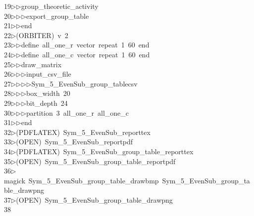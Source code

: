 \begin{tabbing}
19\>$\triangleright$\>$\triangleright$\>group\_theoretic\_activity\ \\[0pt]
20\>$\triangleright$\>$\triangleright$\>$\triangleright$\>export\_group\_table\ \\[0pt]
21\>$\triangleright$\>$\triangleright$\>end\\[0pt]
22\>$\triangleright$\>(ORBITER)\ v\ 2\ \\[0pt]
23\>$\triangleright$\>$\triangleright$\>define\ all\_one\_r\ vector\ repeat\ 1\ 60\ end\ \\[0pt]
24\>$\triangleright$\>$\triangleright$\>define\ all\_one\_c\ vector\ repeat\ 1\ 60\ end\ \\[0pt]
25\>$\triangleright$\>$\triangleright$\>draw\_matrix\ \\[0pt]
26\>$\triangleright$\>$\triangleright$\>$\triangleright$\>input\_csv\_file\ \\[0pt]
27\>$\triangleright$\>$\triangleright$\>$\triangleright$\>$\triangleright$\>Sym\_5\_EvenSub\_group\_tablecsv\ \\[0pt]
28\>$\triangleright$\>$\triangleright$\>$\triangleright$\>box\_width\ 20\ \\[0pt]
29\>$\triangleright$\>$\triangleright$\>$\triangleright$\>bit\_depth\ 24\ \\[0pt]
30\>$\triangleright$\>$\triangleright$\>$\triangleright$\>partition\ 3\ all\_one\_r\ all\_one\_c\ \\[0pt]
31\>$\triangleright$\>$\triangleright$\>end\\[0pt]
32\>$\triangleright$\>(PDFLATEX)\ Sym\_5\_EvenSub\_reporttex\\[0pt]
33\>$\triangleright$\>(OPEN)\ Sym\_5\_EvenSub\_reportpdf\\[0pt]
34\>$\triangleright$\>(PDFLATEX)\ Sym\_5\_EvenSub\_group\_table\_reporttex\\[0pt]
35\>$\triangleright$\>(OPEN)\ Sym\_5\_EvenSub\_group\_table\_reportpdf\\[0pt]
36\>$\triangleright$\>magick\ Sym\_5\_EvenSub\_group\_table\_drawbmp\ Sym\_5\_EvenSub\_group\_table\_drawpng\\[0pt]
37\>$\triangleright$\>(OPEN)\ Sym\_5\_EvenSub\_group\_table\_drawpng\\[0pt]
38\>\end{tabbing}
